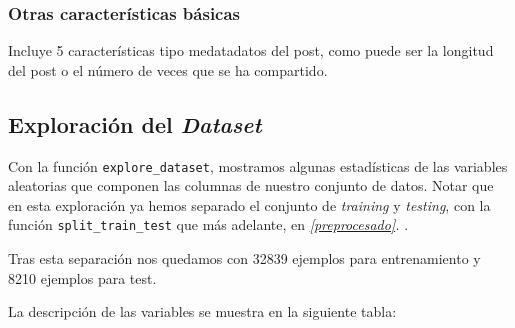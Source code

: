 \documentclass[11pt]{article}
\begin{document}
\subsubsection{Otras características básicas}

Incluye 5 características tipo medatadatos del post, como puede ser la longitud del post o el número de veces que se ha compartido.

\subsection{Exploración del \emph{Dataset}} \label{exploracion_datos} \label{boxplot}

Con la función \lstinline{explore_dataset}, mostramos algunas estadísticas de las variables aleatorias que componen las columnas de nuestro conjunto de datos. Notar que en esta exploración ya hemos separado el conjunto de \emph{training} y \emph{testing}, con la función \lstinline{split_train_test} que más adelante, en \emph{\ref{preprocesado}. }.

Tras esta separación nos quedamos con 32839 ejemplos para entrenamiento y 8210 ejemplos para test.

La descripción de las variables se muestra en la siguiente tabla:
\end{document}

